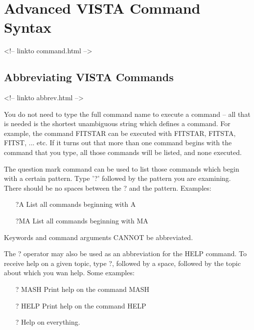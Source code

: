 \chapter{Advanced VISTA Command Syntax}
\begin{rawhtml}
<!-- linkto command.html -->
\end{rawhtml}

%
%

\section{Abbreviating VISTA Commands}
\begin{rawhtml}
<!-- linkto abbrev.html -->
\end{rawhtml}

You do not need to type the full command name to execute a command -- all
that is needed is the shortest unambiguous string which defines a command.
For example, the command FITSTAR can be executed with FITSTAR, FITSTA,
FITST, ... etc.  If it turns out that more than one command begins with the
command that you type, all those commands will be listed, and none
executed.

The question mark command can be used to list those commands which begin
with a certain pattern.  Type '?' followed by the pattern you are
examining.  There should be no spaces between the ? and the pattern.
Examples:

\begin{itemize}
  \item[?A\hfill]{List all commands beginning with A}
  \item[?MA\hfill]{List all commands beginning with MA}
\end{itemize}

Keywords and command arguments CANNOT be abbreviated.

The ? operator may also be used as an abbreviation for the HELP command.
To receive help on a given topic, type ?, followed by a space, followed by
the topic about which you wan help.  Some examples:

\begin{itemize}
  \item[? MASH\hfill]{Print help on the command MASH}
  \item[? HELP\hfill]{Print help on the command HELP}
  \item[?\hfill]{Help on everything.}
\end{itemize}

